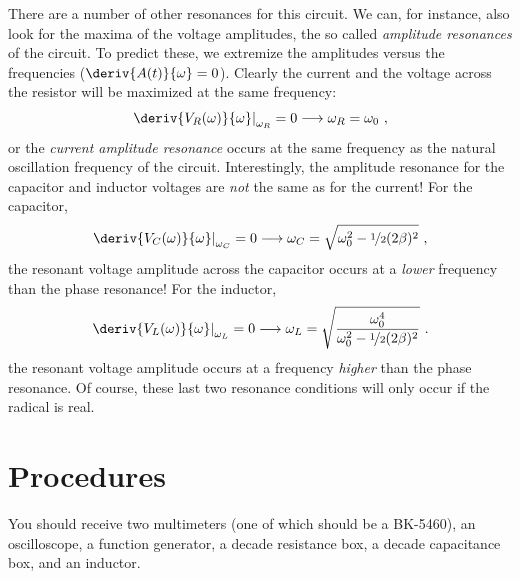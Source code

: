 \documentclass[12pt]{article}
\begin{document}
There are a number of other resonances for this circuit.  We can, for
instance, also look for the maxima of the voltage amplitudes, the so
called \textit{amplitude resonances} of the circuit.  To predict
these, we extremize the amplitudes versus the frequencies
($\deriv{A(t)}{\omega} = 0$).  Clearly the current and the voltage
across the resistor will be maximized at the same frequency:
\begin{gather*}
  \left.\deriv{V_R(\omega)}{\omega}\right|_{\omega_R} = 0
  \longrightarrow \omega_R = \omega_0\ ,
\end{gather*}
or the \textit{current amplitude resonance} occurs at the same
frequency as the natural oscillation frequency of the circuit.
Interestingly, the amplitude resonance for the capacitor and inductor
voltages are \textit{not} the same as for the current!  For the
capacitor,
\begin{gather*}
  \left.\deriv{V_C(\omega)}{\omega}\right|_{\omega_C} = 0 
  \longrightarrow \omega_C = \sqrt{\omega_0^2 -
      \nicefrac{1}{2}(2\beta)^2}\ ,
\end{gather*}
the resonant voltage amplitude across the capacitor occurs at a
\textit{lower} frequency than the phase resonance!  For the inductor,
\begin{gather*}
  \left.\deriv{V_L(\omega)}{\omega}\right|_{\omega_L} = 0 
  \longrightarrow \omega_L = \sqrt{
      \frac{\omega_0^4}{\omega_0^2 - \nicefrac{1}{2}(2\beta)^2}
    }\ .
\end{gather*}
the resonant voltage amplitude occurs at a frequency \textit{higher}
than the phase resonance.  Of course, these last two resonance
conditions will only occur if the radical is real.

\section{Procedures}
\label{sec:procedures}

You should receive two multimeters (one of which should be a
BK-5460), an oscilloscope, a function generator, a
decade resistance box, a decade capacitance box, and an inductor.
\end{document}
